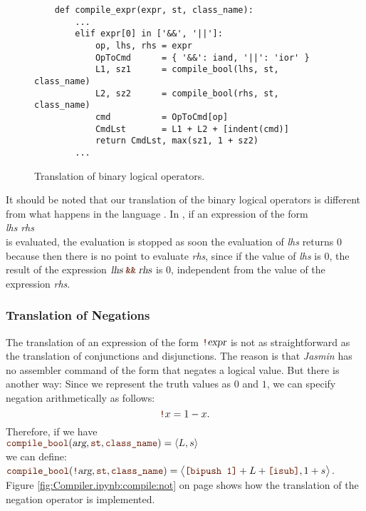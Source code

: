 \begin{figure}[!ht]
\centering
\begin{verbatim}
    def compile_expr(expr, st, class_name):
        ...
        elif expr[0] in ['&&', '||']:
            op, lhs, rhs = expr
            OpToCmd      = { '&&': iand, '||': 'ior' }
            L1, sz1      = compile_bool(lhs, st, class_name)
            L2, sz2      = compile_bool(rhs, st, class_name)
            cmd          = OpToCmd[op]
            CmdLst       = L1 + L2 + [indent(cmd)]
            return CmdLst, max(sz1, 1 + sz2)
        ...
\end{verbatim}
\vspace*{-0.3cm}
\caption{Translation of binary logical operators.}
\label{fig:Compiler.ipynb:compile:iand}
\end{figure}

It should be noted that our translation of the binary logical operators is different from
what happens in the language .  In , if an expression of the form
\\[0.2cm]
\hspace*{1.3cm}
\textsl{lhs} \mytt{\&\&} \textsl{rhs}
\\[0.2cm]
is evaluated, the evaluation is stopped as soon the evaluation of \textsl{lhs}
returns $0$ because then there is no point to evaluate \textsl{rhs}, since if the value of \textsl{lhs} is $0$,
the result of the expression $\textsl{lhs} \;\mytt{\&\&}\; \textsl{rhs}$ is $0$, independent from the value of
the expression \textsl{rhs}. 

\subsubsection{Translation of Negations}
The translation of an expression of the form $\mytt{!}\textsl{expr}$ is not as straightforward as the
translation of conjunctions and disjunctions.  The reason is that \textsl{Jasmin} has no assembler command of
the form  that negates a logical value.  But there is another way: Since we represent the truth
values as $0$ and $1$, we can specify negation arithmetically as follows:
\[ \mytt{!}x = 1 - x. \]
Therefore, if we have
\\[0.2cm]
\hspace*{1.3cm}
$\mytt{compile\_bool}(\textsl{arg}, \mytt{st}, \mytt{class\_name}) = \pair(L, s)$
\\[0.2cm]
we can define:
\\[0.2cm]
\hspace*{1.3cm}
$\mytt{compile\_bool}(\mytt{!}\textsl{arg}, \mytt{st}, \mytt{class\_name})
= \bigl\langle \mytt{[bipush 1]} + L + \mytt{[isub]}, 1 + s \bigr\rangle$.
\\[0.2cm]
Figure \ref{fig:Compiler.ipynb:compile:not} on page \pageref{fig:Compiler.ipynb:compile:not} shows how the
translation of the negation operator is implemented.

